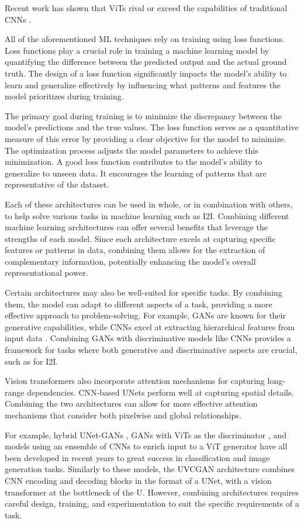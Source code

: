 \documentclass[10pt,twocolumn]{article}
\begin{document}
Recent work has shown that ViTs rival or exceed the capabilities of traditional CNNs \cite{vitcnn}.

All of the aforementioned ML techniques rely on training using loss functions. Loss functions play a crucial role in training a machine learning model by quantifying the difference between the predicted output and the actual ground truth. The design of a loss function significantly impacts the model's ability to learn and generalize effectively by influencing what patterns and features the model prioritizes during training.

The primary goal during training is to minimize the discrepancy between the model's predictions and the true values. The loss function serves as a quantitative measure of this error by providing a clear objective for the model to minimize. The optimization process adjusts the model parameters to achieve this minimization. A good loss function contributes to the model's ability to generalize to unseen data. It encourages the learning of patterns that are representative of the dataset.

Each of these architectures can be used in whole, or in combination with others, to help solve various tasks in machine learning such as I2I. Combining different machine learning architectures can offer several benefits that leverage the strengths of each model. Since each architecture excels at capturing specific features or patterns in data, combining them allows for the extraction of complementary information, potentially enhancing the model's overall representational power. 

Certain architectures may also be well-suited for specific tasks. By combining them, the model can adapt to different aspects of a task, providing a more effective approach to problem-solving. For example, GANs are known for their generative capabilities, while CNNs excel at extracting hierarchical features from input data \cite{ensemble}. Combining GANs with discriminative models like CNNs provides a framework for tasks where both generative and discriminative aspects are crucial, such as for I2I. \cite{cnn} \cite{i2i}

Vision transformers also incorporate attention mechanisms for capturing long-range dependencies. CNN-based UNets perform well at capturing spatial details. Combining the two architectures can allow for more effective attention mechanisms that consider both pixelwise and global relationships. \cite{uvcgan} \cite{vit}

For example, hybrid UNet-GANs \cite{hybrid1}, GANs with ViTs as the discriminator \cite{hybrid2}, and models using an ensemble of CNNs to enrich input to a ViT generator \cite{hybrid3} have all been developed in recent years to great success in classification and image generation tasks. Similarly to these models, the UVCGAN architecture combines CNN encoding and decoding blocks in the format of a UNet, with a vision transformer at the bottleneck of the U. However, combining architectures requires careful design, training, and experimentation to suit the specific requirements of a task. 
\end{document}
